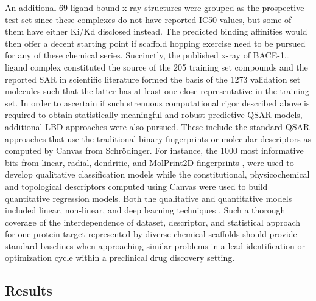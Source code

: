 An additional 69 ligand bound x-ray structures were grouped as the prospective test set since these complexes do not have reported IC50 values, but some of them have either Ki/Kd disclosed instead.  The predicted binding affinities would then offer a decent starting point if scaffold hopping exercise need to be pursued for any of these chemical series.   Succinctly, the published x-ray of BACE-1…ligand complex constituted the source of the 205 training set compounds and the reported SAR in scientific literature formed the basis of the 1273 validation set molecules such that the latter has at least one close representative in the training set. 
In order to ascertain if such strenuous computational rigor described above is required to obtain statistically meaningful and robust predictive QSAR models, additional LBD approaches were also pursued.  These include the standard QSAR approaches that use the traditional binary fingerprints or molecular descriptors as computed by Canvas \cite{canvasrelease20131} from Schrödinger.  For instance, the 1000 most informative bits from linear, radial, dendritic, and MolPrint2D fingerprints \cite{sastry2010large,an2013kernel}, were used to develop qualitative classification models while the constitutional, physicochemical and topological descriptors computed using Canvas were used to build quantitative regression models.  Both the qualitative and quantitative models included linear, non-linear, and deep learning techniques \cite{ramsundar2015massively}.  Such a thorough coverage of the interdependence of dataset, descriptor, and statistical approach for one protein target represented by diverse chemical scaffolds should provide standard baselines when approaching similar problems in a lead identification or optimization cycle within a preclinical drug discovery setting.

\subsection{Results}

